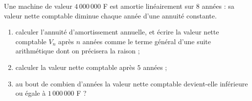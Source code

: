 \begin{exercice}
Une machine de valeur $4\,000\,000$ F est amortie linéairement sur $8$ années : sa valeur nette comptable diminue chaque année d'une annuité constante.
\begin{enumerate}
\item calculer l'annuité d'amortissement annuelle, et écrire la valeur nette comptable $V_{n}$ après $n$ années comme le terme général d'une suite arithmétique dont on précisera la raison ;
\item calculer la valeur nette comptable après $5$ années ;
\item au bout de combien d'années la valeur nette comptable devient-elle inférieure ou égale à $1\,000\,000$ F ?
\end{enumerate}
\end{exercice}
